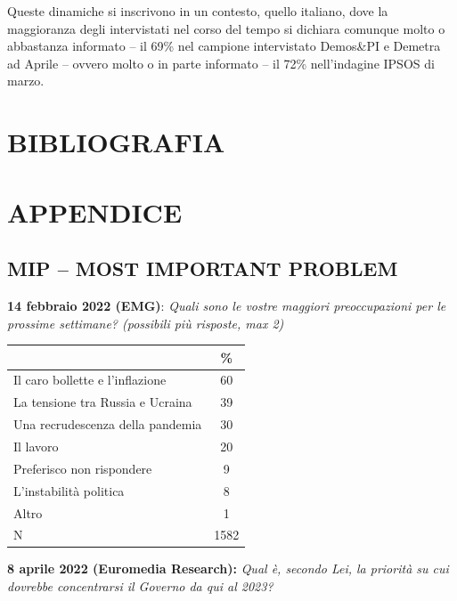 \documentclass[
]{book}
\begin{document}
Queste dinamiche si inscrivono in un contesto, quello italiano, dove la maggioranza degli intervistati nel corso del tempo si dichiara comunque molto o abbastanza informato -- il 69\% nel campione intervistato Demos\&PI e Demetra ad Aprile -- ovvero molto o in parte informato -- il 72\% nell'indagine IPSOS di marzo.

\hypertarget{bibliografia}{%
\chapter*{BIBLIOGRAFIA}\label{bibliografia}}

\hypertarget{appendice}{%
\chapter*{APPENDICE}\label{appendice}}

\hypertarget{mip-most-important-problem}{%
\section*{MIP -- MOST IMPORTANT PROBLEM}\label{mip-most-important-problem}}

\textbf{14 febbraio 2022 (EMG)}: \emph{Quali sono le vostre maggiori preoccupazioni per le prossime settimane? (possibili più risposte, max 2)}

\begin{longtable}[]{@{}lc@{}}
\toprule\noalign{}
& \% \\
\midrule\noalign{}
\endhead
\bottomrule\noalign{}
\endlastfoot
Il caro bollette e l'inflazione & 60 \\
La tensione tra Russia e Ucraina & 39 \\
Una recrudescenza della pandemia & 30 \\
Il lavoro & 20 \\
Preferisco non rispondere & 9 \\
L'instabilità politica & 8 \\
Altro & 1 \\
N & 1582 \\
\end{longtable}

\textbf{8 aprile 2022 (Euromedia Research):} \emph{Qual è, secondo Lei, la priorità su cui dovrebbe concentrarsi il Governo da qui al 2023?}
\end{document}
